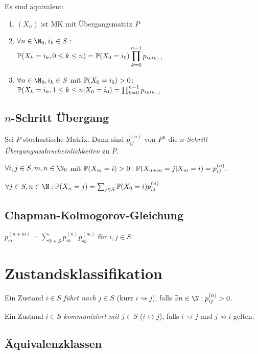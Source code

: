 Es sind äquivalent:

\begin{enumerate}[label=(\alph*)]
	\item $(X_n)$ ist MK mit Übergangsmatrix $P$
	\item $\forall n \in \N_0, i_k \in S :$ \vspace*{-2mm} \\ $\P(X_k = i_k, 0 \leq k \leq n) = \P(X_0 = i_0) \displaystyle\prod_{k=0}^{n-1} p_{i_k i_{k+1}}$
	\item $\forall n \in \N_0, i_k \in S$ mit $\P(X_0 = i_0) > 0$: \\ $\P(X_k = i_k, 1 \leq k \leq n | X_0 = i_0) = \prod_{k=0}^{n-1} p_{i_k i_{k+1}}$
\end{enumerate}

\subsection*{$n$-Schritt Übergang}

Sei $P$ stochastische Matrix. Dann sind $p_{ij}^{(n)}$ von $P^n$ die \emph{$n$-Schritt-Übergangswahrscheinlichkeiten} zu $P$.

$\forall i, j \in S, m, n \in \N_0$ mit $\P(X_m = i) > 0 : \\ \P(X_{n+m} = j | X_m = i) = p_{ij}^{(n)}.$

$\forall j \in S, n \in \N : \P(X_n = j) = \sum_{j \in S} \P(X_0 = i) p_{ij}^{(n)}$

\subsection*{Chapman-Kolmogorov-Gleichung}

$p_{ij}^{(n+m)} = \displaystyle\sum_{k \in S} p_{ik}^{(n)} p_{kj}^{(m)}$ für $i, j \in S$.

\section*{Zustandsklassifikation}

Ein Zustand $i \in S$ \emph{führt nach} $j \in S$ (kurz $i \rightsquigarrow j$), falls $\exists n \in \N : p_{ij}^{(n)} > 0$.

Ein Zustand $i \in S$ \emph{kommuniziert mit} $j \in S$ ($i \leftrightarrow j$), falls $i \rightsquigarrow j$ und $j \rightsquigarrow i$ gelten.

\subsection*{Äquivalenzklassen}

